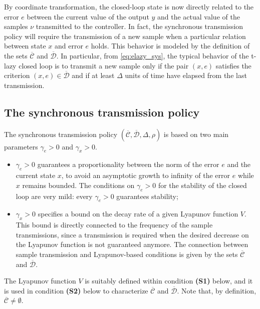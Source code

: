 \documentclass[twocolumn]{autart}
\begin{document}
{
By coordinate transformation, the closed-loop state is now
directly related to the error $e$ between the current value of the output $y$
and the actual value of the samples $\nu$ transmitted to the controller.
In fact, the synchronous transmission policy will require the transmission of
a new sample when a particular relation between state $x$ and error $e$ holds.
This behavior is modeled by the definition of 
the sets $\overline{\mathcal{C}}$ and $\overline{\mathcal{D}}$.
In particular, 
from \eqref{eq:elazy_sys}, the typical behavior of the 
t-lazy closed loop is to transmit a new sample
only if the pair $(x,e)$ satisfies the criterion 
$(x,e) \in \overline{\mathcal{D}}$ and if at least $\Delta$ 
units of time have elapsed from the last transmission.
}

\subsection{The synchronous transmission policy}

The { synchronous} transmission policy 
$(\overline{\mathcal{C}},\overline{\mathcal{D}},\Delta,\rho)$ 
is based on two main parameters $\gamma_e>0$ and $\gamma_x>0$.
{
\begin{itemize}
\item $\gamma_e>0$ guarantees a proportionality between the norm of the error $e$ 
and the current state $x$, to avoid an asymptotic growth to infinity of the
error $e$ while $x$ remains bounded. The conditions on $\gamma_e>0$ for
the stability of the closed loop are very mild: every $\gamma_e>0$
guarantees stability;
 \item $\gamma_x>0$ specifies a bound on
the decay rate of a given Lyapunov function $V$. This bound is 
directly connected to the frequency of the sample transmissions,
since a transmission is required when the desired
decrease on the Lyapunov function is not guaranteed anymore.
The connection between sample transmission and Lyapunov-based
conditions is given by the sets $\overline{\mathcal{C}}$ and $\overline{\mathcal{D}}$.
\end{itemize}
The Lyapunov function $V$ is suitably defined within condition \textbf{(S1)} below,
and it is used in condition \textbf{(S2)} below to characterize 
$\overline{\mathcal{C}}$ and $\overline{\mathcal{D}}$. 
Note that, by definition, $\overline{\mathcal{C}}\neq \emptyset$.
}
\end{document}
